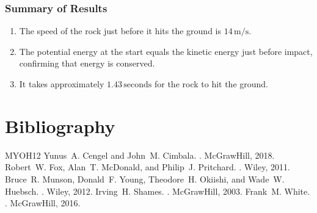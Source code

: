 \documentclass[letterpaper,10pt,english]{jupyterBook}
\begin{document}
\subsection{Summary of Results}
\label{\detokenize{prerequisites:id22}}\begin{enumerate}
%
\item {} 
\sphinxAtStartPar
The speed of the rock just before it hits the ground is \(14 \, \text{m/s}\).

\item {} 
\sphinxAtStartPar
The potential energy at the start equals the kinetic energy just before impact, confirming that energy is conserved.

\item {} 
\sphinxAtStartPar
It takes approximately \(1.43 \, \text{seconds}\) for the rock to hit the ground.

\end{enumerate}

\sphinxstepscope


\chapter{Bibliography}
\label{\detokenize{bibliography:bibliography}}\label{\detokenize{bibliography::doc}}
\begin{sphinxthebibliography}{MYOH12}
\sphinxAtStartPar
Yunus A. Cengel and John M. Cimbala. . McGraw\sphinxhyphen{}Hill, 2018.
\sphinxAtStartPar
Robert W. Fox, Alan T. McDonald, and Philip J. Pritchard. . Wiley, 2011.
\sphinxAtStartPar
Bruce R. Munson, Donald F. Young, Theodore H. Okiishi, and Wade W. Huebsch. . Wiley, 2012.
\sphinxAtStartPar
Irving H. Shames. . McGraw\sphinxhyphen{}Hill, 2003.
\sphinxAtStartPar
Frank M. White. . McGraw\sphinxhyphen{}Hill, 2016.
\end{sphinxthebibliography}







\renewcommand{\indexname}{Index}
\printindex
\end{document}

